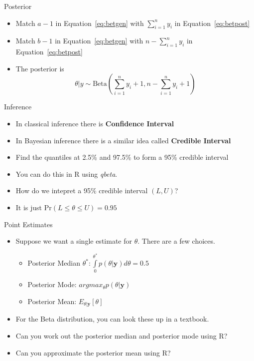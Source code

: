\documentclass[10pt]{beamer}
\begin{document}
\begin{frame}{Posterior}
  \begin{itemize}
  \item Match $a-1$ in Equation~\ref{eq:betgen} with $\sum\limits_{i=1}^ny_i$ in Equation~\ref{eq:betpost}

  \item Match $b-1$ in Equation~\ref{eq:betgen} with $n-\sum\limits_{i=1}^ny_i$ in Equation~\ref{eq:betpost}

  \item The posterior is
    \begin{equation}
      \theta|y\sim\mbox{Beta}\left(\sum\limits_{i=1}^ny_i+1,n-\sum\limits_{i=1}^ny_i+1\right)
    \end{equation}
  \end{itemize}
\end{frame}
\begin{frame}{Inference}
  \begin{itemize}
  \item In classical inference there is {\bf Confidence Interval}

  \item In Bayesian inference there is a similar idea called {\bf Credible Interval}

  \item Find the quantiles at 2.5\% and 97.5\% to form a 95\% credible interval

  \item You can do this in R using {\em qbeta}.

  \item How do we intepret a 95\% credible interval $(L,U)$?

  \item It is just $\mbox{Pr}\left(L\leq\theta\leq U\right)=0.95$
  \end{itemize}
\end{frame}
\begin{frame}{Point Estimates}
  \begin{itemize}
  \item Suppose we want a single estimate for $\theta$.  There
    are a few choices.

    \begin{itemize}

    \item Posterior Median $\theta^*: \int\limits_{0}^{\theta^*}p(\theta|{\bm y})d\theta=0.5$

    \item Posterior Mode: $argmax_\theta p(\theta|{\bm y})$

    \item Posterior Mean: $E_{\theta|{\bm y}}[\theta]$
    \end{itemize}

  \item For the Beta distribution, you can look these up in a textbook.

  \item Can you work out the posterior median and posterior mode using R?

  \item Can you approximate the posterior mean using R?
  \end{itemize}
\end{frame}
\end{document}
